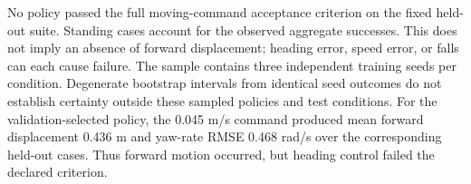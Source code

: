 No policy passed the full moving-command acceptance criterion on the fixed held-out suite. Standing cases account for the observed aggregate successes. This does not imply an absence of forward displacement; heading error, speed error, or falls can each cause failure. The sample contains three independent training seeds per condition. Degenerate bootstrap intervals from identical seed outcomes do not establish certainty outside these sampled policies and test conditions. For the validation-selected policy, the 0.045 m/s command produced mean forward displacement 0.436 m and yaw-rate RMSE 0.468 rad/s over the corresponding held-out cases. Thus forward motion occurred, but heading control failed the declared criterion. 
